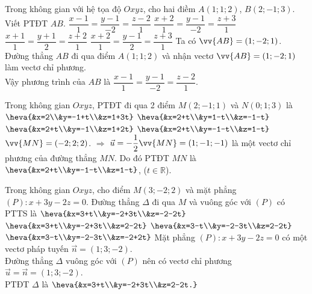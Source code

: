\begin{ex}%
	Trong không gian với hệ tọa độ $O x y z$, cho hai điềm $A(1;1;2)$, $B(2;-1;3)$. Viết PTĐT $AB$.
	\choice 
	{\True $\dfrac{x-1}{1}=\dfrac{y-1}{-2}=\dfrac{z-2}{1}$}
	{$\dfrac{x+2}{1}=\dfrac{y-1}{-2}=\dfrac{z+3}{1}$}
	{$\dfrac{x+1}{1}=\dfrac{y+1}{2}=\dfrac{z+2}{1}$}
	{$\dfrac{x+2}{1}=\dfrac{y-1}{2}=\dfrac{z+3}{1}$}
	\loigiai 
	{
Ta có $\vv{AB}=(1;-2;1)$.\\
Đường thẳng $AB$ đi qua điểm $A(1;1;2)$ và nhận vectơ $\vv{AB}=(1;-2;1)$ làm vectơ chỉ phương.\\
Vậy phương trình của $AB$ là $\dfrac{x-1}{1}=\dfrac{y-1}{-2}=\dfrac{z-2}{1}$.
	}
\end{ex}

\begin{ex}%
Trong không gian $O x y z$, PTĐT đi qua 2 điểm $M(2;-1;1)$ và $N(0;1;3)$ là 
\choice 
{$\heva{&x=2\\&y=-1+t\\&z=1+3t}$}
{$\heva{&x=2+t\\&y=1-t\\&z=-1-t}$}
{$\heva{&x=2+t\\&y=-1\\&z=1+2t}$}
{\True $\heva{&x=2+t\\&y=-1-t\\&z=1-t}$}
\loigiai
{
$\vv{M N}=(-2;2;2)$.
$\Rightarrow$ $\vec{u}=-\dfrac{1}{2}\vv{MN}=(1;-1;-1)$ là một vectơ chỉ phương của đường thẳng $MN$. Do đó PTĐT $MN$ là $\heva{&x=2+t\\&y=-1-t\\&z=1-t}$, ($t\in\mathbb{R}$).
}
\end{ex}

\begin{ex}%
	Trong không gian $O x y z$, cho điểm $M(3;-2;2)$ và mặt phẳng $(P): x+3y-2z=0$. Đường thẳng $\Delta$ đi qua $M$ và vuông góc với $(P)$ có PTTS là 
	\choice 
	{$\heva{&x=3+t\\&y=-2+3t\\&z=-2-2t}$}
	{\True $\heva{&x=3+t\\&y=-2+3t\\&z=2-2t}$}
	{$\heva{&x=3-t\\&y=-2-3t\\&z=2-2t}$}
	{$\heva{&x=3-t\\&y=-2-3t\\&z=-2+2t}$}
					\loigiai 
					{
Mặt phẳng $(P)\colon x+3y-2z=0$ có một vectơ pháp tuyến $\vec{n}=(1;3;-2)$.\\
Đường thẳng $\Delta$ vuông góc với $(P)$ nên có vectơ chỉ phương $\vec{u}=\vec{n}=(1;3;-2)$.\\
PTĐT $\Delta$ là $\heva{&x=3+t\\&y=-2+3t\\&z=2-2t.}$	
					}
\end{ex}

